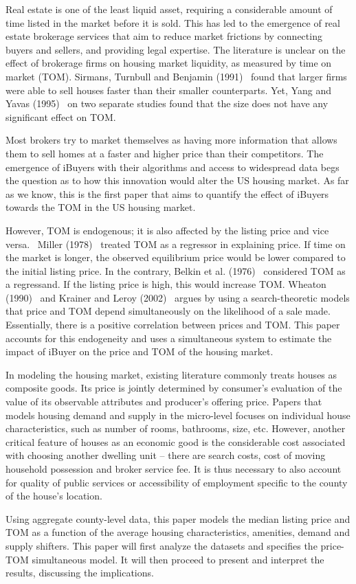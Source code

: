 Real estate is one of the least liquid asset, requiring a considerable amount of time listed in the market before it is sold. This has led to the emergence of real estate brokerage services that aim to reduce market frictions by connecting buyers and sellers, and providing legal expertise. The literature is unclear on the effect of brokerage firms on housing market liquidity, as measured by time on market (TOM). Sirmans, Turnbull and Benjamin (1991) \cite{Sirman} found that larger firms were able to sell houses faster than their smaller counterparts. Yet, Yang and Yavas (1995) \cite{Yavas} on two separate studies found that the size does not have any significant effect on TOM.  

Most brokers try to market themselves as having more information that allows them to sell homes at a faster and higher price than their competitors. The emergence of iBuyers with their algorithms and access to widespread data begs the question as to how this innovation would alter the US housing market. As far as we know, this is the first paper that aims to quantify the effect of iBuyers towards the TOM in the US housing market.  

However, TOM is endogenous; it is also affected by the listing price and vice versa.  Miller (1978) \cite{Miller} treated TOM as a regressor in explaining price. If time on the market is longer, the observed equilibrium price would be lower compared to the initial listing price. In the contrary, Belkin et al. (1976) \cite{Belkin} considered TOM as a regressand. If the listing price is high, this would increase TOM. Wheaton (1990) \cite{Wheaton} and Krainer and Leroy (2002) \cite{Krainer} argues by using a search-theoretic models that price and TOM depend simultaneously on the likelihood of a sale made. Essentially, there is a positive correlation between prices and TOM. This paper accounts for this endogeneity and uses a simultaneous system to estimate the impact of iBuyer on the price and TOM of the housing market.   

In modeling the housing market, existing literature commonly treats houses as composite goods. Its price is jointly determined by consumer’s evaluation of the value of its observable attributes and producer’s offering price. Papers that models housing demand and supply in the micro-level focuses on individual house characteristics, such as number of rooms, bathrooms, size, etc. However, another critical feature of houses as an economic good is the considerable cost associated with choosing another dwelling unit – there are search costs, cost of moving household possession and broker service fee. It is thus necessary to also account for quality of public services or accessibility of employment specific to the county of the house’s location. 

Using aggregate county-level data, this paper models the median listing price and TOM as a function of the average housing characteristics, amenities, demand and supply shifters. This paper will first analyze the datasets and specifies the price-TOM simultaneous model. It will then proceed to present and interpret the results, discussing the implications.   
